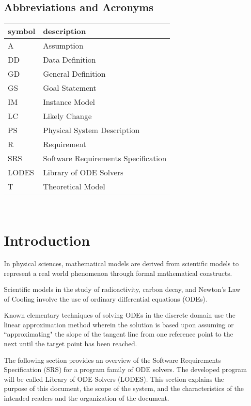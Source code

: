 \documentclass[12pt]{article}
\newcommand{\progname}{LODES} %
\newcommand{\progdesc}{Library of ODE Solvers}
\begin{document}
\subsection{Abbreviations and Acronyms}

\renewcommand{\arraystretch}{1.2}
\begin{tabular}{l l} 
  \toprule		
  \textbf{symbol} & \textbf{description}\\
  \midrule 
  A & Assumption\\
  DD & Data Definition\\
  GD & General Definition\\
  GS & Goal Statement\\
  IM & Instance Model\\
  LC & Likely Change\\
  PS & Physical System Description\\
  R & Requirement\\
  SRS & Software Requirements Specification\\
  \progname{} & \progdesc{}\\
  T & Theoretical Model\\
  \bottomrule
\end{tabular}\\


\newpage
{}

\section{Introduction}

In physical sciences, mathematical models are derived from scientific models to
represent a real world phenomenon through formal mathematical constructs.

Scientific models in the study of radioactivity, carbon decay, and Newton's Law of Cooling
involve the use of ordinary differential equations (ODEs).

Known elementary techniques of solving ODEs in the discrete domain use the linear approximation
method wherein the solution is based upon assuming or ``approximating" the slope of the tangent
line from one reference point to the next until the target point has been reached.

The following section provides an overview of the Software Requirements
Specification (SRS) for a program family of ODE solvers. The developed program will be
called Library of ODE Solvers (\progname{}). This section explains the purpose of this
document, the scope of the system, and the characteristics of the intended readers and the
organization of the document.
\end{document}
